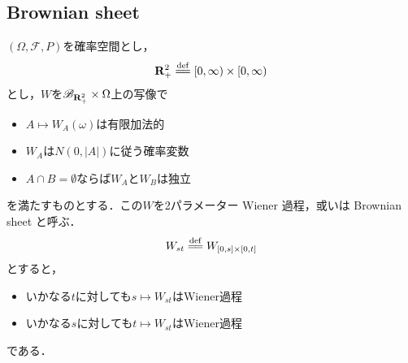 \subsection{Brownian sheet}
	$(\Omega,\mathscr{F},P)$を確率空間とし，
	\begin{align}
		\R_{+}^{2} \defeq [0,\infty) \times [0,\infty)
	\end{align}
	とし，$W$を$\mathscr{B}_{\mathbf{R}_{+}^{2}} \times \Omega$上の写像で
	\begin{itemize}
		\item $A \longmapsto W_{A}(\omega)$は有限加法的
		\item $W_{A}$は$N(0,|A|)$に従う確率変数
		\item $A \cap B = \emptyset$ならば$W_{A}$と$W_{B}$は独立
	\end{itemize}
	を満たすものとする．この$W$を2パラメーター Wiener 過程，或いは Brownian sheet と呼ぶ．
	\begin{align}
		W_{st} \defeq W_{[0,s] \times [0,t]}
	\end{align}
	とすると，
	\begin{itemize}
		\item いかなる$t$に対しても$s \longmapsto W_{st}$はWiener過程
		\item いかなる$s$に対しても$t \longmapsto W_{st}$はWiener過程
	\end{itemize}
	である．